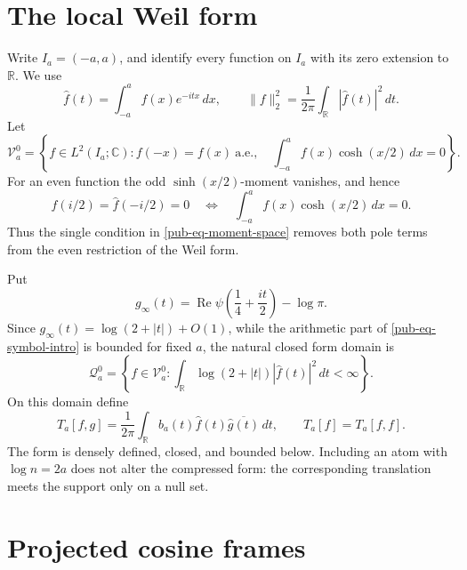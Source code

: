 \documentclass[11pt]{article}
\theoremstyle{remark}
\begin{document}
\section{The local Weil form}
\label{pub-sec-weil-form}

Write \(I_a=(-a,a)\), and identify every function on \(I_a\) with its zero extension to \(\mathbb R\).
We use
\begin{equation}
 \widehat f(t)=\int_{-a}^{a}f(x)e^{-itx}\,dx,
 \qquad
 \lVert f\rVert_2^2=\frac1{2\pi}
        \int_{\mathbb R}|\widehat f(t)|^2\,dt.
 \label{pub-eq-fourier-normalization}
\end{equation}
Let
\begin{equation}
 \mathcal V_a^0=
 \left\{f\in L^2(I_a;\mathbb C):
 f(-x)=f(x)\ \text{a.e.},\quad
 \int_{-a}^{a}f(x)\cosh(x/2)\,dx=0\right\}.
 \label{pub-eq-moment-space}
\end{equation}
For an even function the odd \(\sinh(x/2)\)-moment vanishes, and hence
\begin{equation}
 \widehat f(i/2)=\widehat f(-i/2)=0
 \quad\Longleftrightarrow\quad
 \int_{-a}^{a}f(x)\cosh(x/2)\,dx=0.
 \label{pub-eq-two-poles-one-moment}
\end{equation}
Thus the single condition in \eqref{pub-eq-moment-space} removes both pole terms from the even restriction of the Weil form.

Put
\begin{equation}
 g_\infty(t)=
 \operatorname{Re}\psi\!\left(\frac14+\frac{it}{2}\right)-\log\pi.
 \label{pub-eq-g-infty}
\end{equation}
Since \(g_\infty(t)=\log(2+|t|)+O(1)\),
while the arithmetic part of \eqref{pub-eq-symbol-intro} is bounded for fixed \(a\),
the natural closed form domain is
\begin{equation}
 \mathcal Q_a^0=
 \left\{f\in\mathcal V_a^0:
 \int_{\mathbb R}\log(2+|t|)|\widehat f(t)|^2\,dt<\infty\right\}.
 \label{pub-eq-form-domain}
\end{equation}
On this domain define
\begin{equation}
 T_a[f,g]=\frac1{2\pi}\int_{\mathbb R}
     b_a(t)\widehat f(t)\overline{\widehat g(t)}\,dt,
 \qquad T_a[f]=T_a[f,f].
 \label{pub-eq-local-form}
\end{equation}
The form is densely defined, closed, and bounded below.
Including an atom with \(\log n=2a\) does not alter the compressed form:
the corresponding translation meets the support only on a null set.

\section{Projected cosine frames}
\label{pub-sec-cosine-frame}
\end{document}
